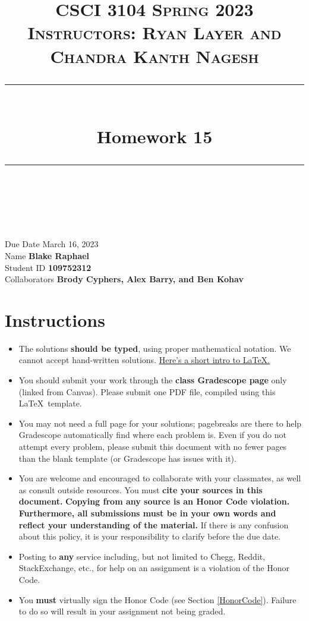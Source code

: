 \documentclass[11pt]{article}
\title{
\normalfont \normalsize 
\textsc{CSCI 3104 Spring 2023 \\ 
Instructors: Ryan Layer and Chandra Kanth Nagesh} \\
[10pt] 
\rule{\linewidth}{0.5pt} \\[6pt] 
\huge Homework 15 \\
\rule{\linewidth}{2pt}  \\[10pt]
}
\author{}
\date{}
\theoremstyle{definition}
\theoremstyle{definition}
\theoremstyle{definition}
\begin{document}

\maketitle


\noindent
Due Date \dotfill March 16, 2023 \\
Name \dotfill \textbf{Blake Raphael} \\
Student ID \dotfill \textbf{109752312} \\
Collaborators \dotfill \textbf{Brody Cyphers, Alex Barry, and Ben Kohav}

\tableofcontents

\section{Instructions}
 \begin{itemize}
	\item The solutions \textbf{should be typed}, using proper mathematical notation. We cannot accept hand-written solutions. \href{http://ece.uprm.edu/~caceros/latex/introduction.pdf}{Here's a short intro to \LaTeX.}
	\item You should submit your work through the \textbf{class Gradescope page} only (linked from Canvas). Please submit one PDF file, compiled using this \LaTeX \ template.
	\item You may not need a full page for your solutions; pagebreaks are there to help Gradescope automatically find where each problem is. Even if you do not attempt every problem, please submit this document with no fewer pages than the blank template (or Gradescope has issues with it).

	\item You are welcome and encouraged to collaborate with your classmates, as well as consult outside resources. You must \textbf{cite your sources in this document.} \textbf{Copying from any source is an Honor Code violation. Furthermore, all submissions must be in your own words and reflect your understanding of the material.} If there is any confusion about this policy, it is your responsibility to clarify before the due date. 

	\item Posting to \textbf{any} service including, but not limited to Chegg, Reddit, StackExchange, etc., for help on an assignment is a violation of the Honor Code.

	\item You \textbf{must} virtually sign the Honor Code (see Section \ref{HonorCode}). Failure to do so will result in your assignment not being graded.
\end{itemize}
\end{document}
